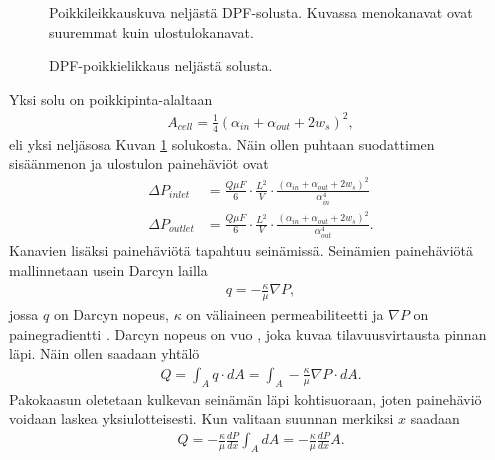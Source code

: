 \begin{figure}[H]
    \centering 
               {Poikkileikkauskuva neljästä DPF-solusta. Kuvassa menokanavat ovat suuremmat kuin ulostulokanavat.}
    \caption{DPF-poikkielikkaus neljästä solusta.}
    \label{fig:hac_dpf_clean}
\end{figure}
Yksi solu on poikkipinta-alaltaan
\begin{align}
    A_{cell}=\frac{1}{4}(\alpha_{in}+\alpha_{out}+2w_s)^2,
\end{align}
eli yksi neljäsosa Kuvan \ref{fig:hac_dpf_clean} solukosta. Näin ollen puhtaan suodattimen sisäänmenon ja ulostulon painehäviöt ovat
\begin{align}
    \Delta P_{inlet} &=\frac{Q \mu F}{6}\cdot \frac{L^2}{V} \cdot \frac{(\alpha_{in}+\alpha_{out}+2w_s)^2}{\alpha_{in}^4} \label{eq:DeltaP_inlet_clean}
    \\ 
    \Delta P_{outlet} &=\frac{Q \mu F}{6}\cdot \frac{L^2}{V} \cdot \frac{(\alpha_{in}+\alpha_{out}+2w_s)^2}{\alpha_{out}^4}.
\end{align}
Kanavien lisäksi painehäviötä tapahtuu seinämissä. Seinämien painehäviötä mallinnetaan usein Darcyn lailla \cite{dieselnet_wall_flow_monolith}\cite{Konstandopoulos1989_wallflow}
\begin{align}
    q = - \frac{\kappa}{\mu}\nabla P,
\end{align}
jossa \(q\) on Darcyn nopeus, \(\kappa\) on väliaineen permeabiliteetti ja \(\nabla P\) on painegradientti \cite{feder2021_porous}. 
 Darcyn nopeus on vuo \cite{reible_env_eng}, joka kuvaa tilavuusvirtausta pinnan läpi. Näin ollen saadaan yhtälö
\begin{align}
    Q = \int_A q \cdot dA = \int_A - \frac{\kappa}{\mu} \nabla P \cdot dA.
\end{align}
Pakokaasun oletetaan kulkevan seinämän läpi kohtisuoraan, joten painehäviö voidaan laskea yksiulotteisesti. Kun valitaan suunnan merkiksi \(x\) saadaan
\begin{align}
    Q = - \frac{\kappa}{\mu} \frac{dP}{dx} \int_A dA = - \frac{\kappa}{\mu} \frac{dP}{dx} A.
\end{align}
